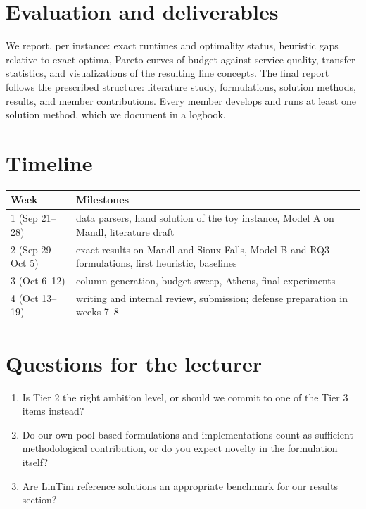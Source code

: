 \documentclass[11pt]{article}
\begin{document}
\section{Evaluation and deliverables}

We report, per instance: exact runtimes and optimality status, heuristic gaps relative to exact optima, Pareto curves of budget against service quality, transfer statistics, and visualizations of the resulting line concepts. The final report follows the prescribed structure: literature study, formulations, solution methods, results, and member contributions. Every member develops and runs at least one solution method, which we document in a logbook.

\section{Timeline}

\begin{center}
\begin{tabular}{ll}
\toprule
Week & Milestones \\
\midrule
1 (Sep 21--28) & data parsers, hand solution of the toy instance, Model A on Mandl, literature draft \\
2 (Sep 29--Oct 5) & exact results on Mandl and Sioux Falls, Model B and RQ3 formulations, first heuristic, baselines \\
3 (Oct 6--12) & column generation, budget sweep, Athens, final experiments \\
4 (Oct 13--19) & writing and internal review, submission; defense preparation in weeks 7--8 \\
\bottomrule
\end{tabular}
\end{center}

\section{Questions for the lecturer}

\begin{enumerate}
  \item Is Tier 2 the right ambition level, or should we commit to one of the Tier 3 items instead?
  \item Do our own pool-based formulations and implementations count as sufficient methodological contribution, or do you expect novelty in the formulation itself?
  \item Are LinTim reference solutions an appropriate benchmark for our results section?
\end{enumerate}
\end{document}
